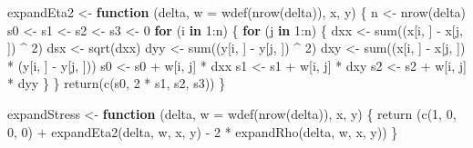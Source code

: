 \documentclass[
  12pt,
  letterpaper,
  DIV=11,
  numbers=noendperiod]{scrreprt}
\newenvironment{Shaded}{\begin{snugshade}}{\end{snugshade}}
\newcommand{\AttributeTok}[1]{\textcolor[rgb]{0.40,0.45,0.13}{#1}}
\newcommand{\ControlFlowTok}[1]{\textcolor[rgb]{0.00,0.23,0.31}{\textbf{#1}}}
\newcommand{\DecValTok}[1]{\textcolor[rgb]{0.68,0.00,0.00}{#1}}
\newcommand{\FunctionTok}[1]{\textcolor[rgb]{0.28,0.35,0.67}{#1}}
\newcommand{\NormalTok}[1]{\textcolor[rgb]{0.00,0.23,0.31}{#1}}
\newcommand{\OtherTok}[1]{\textcolor[rgb]{0.00,0.23,0.31}{#1}}
\newcommand{\SpecialCharTok}[1]{\textcolor[rgb]{0.37,0.37,0.37}{#1}}
\theoremstyle{remark}
\begin{document}
\begin{Shaded}
\begin{Highlighting}[]
\NormalTok{expandEta2 }\OtherTok{\textless{}{-}} \ControlFlowTok{function}\NormalTok{ (delta, }\AttributeTok{w =} \FunctionTok{wdef}\NormalTok{(}\FunctionTok{nrow}\NormalTok{(delta)), x, y) \{}
\NormalTok{  n }\OtherTok{\textless{}{-}} \FunctionTok{nrow}\NormalTok{(delta)}
\NormalTok{  s0 }\OtherTok{\textless{}{-}}\NormalTok{ s1 }\OtherTok{\textless{}{-}}\NormalTok{ s2 }\OtherTok{\textless{}{-}}\NormalTok{ s3 }\OtherTok{\textless{}{-}} \DecValTok{0}
  \ControlFlowTok{for}\NormalTok{ (i }\ControlFlowTok{in} \DecValTok{1}\SpecialCharTok{:}\NormalTok{n) \{}
    \ControlFlowTok{for}\NormalTok{ (j }\ControlFlowTok{in} \DecValTok{1}\SpecialCharTok{:}\NormalTok{n) \{}
\NormalTok{      dxx }\OtherTok{\textless{}{-}} \FunctionTok{sum}\NormalTok{((x[i, ] }\SpecialCharTok{{-}}\NormalTok{ x[j, ]) }\SpecialCharTok{\^{}} \DecValTok{2}\NormalTok{)}
\NormalTok{      dsx }\OtherTok{\textless{}{-}} \FunctionTok{sqrt}\NormalTok{(dxx)}
\NormalTok{      dyy }\OtherTok{\textless{}{-}} \FunctionTok{sum}\NormalTok{((y[i, ] }\SpecialCharTok{{-}}\NormalTok{ y[j, ]) }\SpecialCharTok{\^{}} \DecValTok{2}\NormalTok{)}
\NormalTok{      dxy }\OtherTok{\textless{}{-}} \FunctionTok{sum}\NormalTok{((x[i, ] }\SpecialCharTok{{-}}\NormalTok{ x[j, ]) }\SpecialCharTok{*}\NormalTok{ (y[i, ] }\SpecialCharTok{{-}}\NormalTok{ y[j, ]))}
\NormalTok{      s0 }\OtherTok{\textless{}{-}}\NormalTok{ s0 }\SpecialCharTok{+}\NormalTok{ w[i, j] }\SpecialCharTok{*}\NormalTok{ dxx}
\NormalTok{      s1 }\OtherTok{\textless{}{-}}\NormalTok{ s1 }\SpecialCharTok{+}\NormalTok{ w[i, j] }\SpecialCharTok{*}\NormalTok{ dxy}
\NormalTok{      s2 }\OtherTok{\textless{}{-}}\NormalTok{ s2 }\SpecialCharTok{+}\NormalTok{ w[i, j] }\SpecialCharTok{*}\NormalTok{ dyy}
\NormalTok{    \}}
\NormalTok{  \}}
  \FunctionTok{return}\NormalTok{(}\FunctionTok{c}\NormalTok{(s0, }\DecValTok{2} \SpecialCharTok{*}\NormalTok{ s1, s2, s3))}
\NormalTok{\}}

\NormalTok{expandStress }\OtherTok{\textless{}{-}} \ControlFlowTok{function}\NormalTok{ (delta, }\AttributeTok{w =} \FunctionTok{wdef}\NormalTok{(}\FunctionTok{nrow}\NormalTok{(delta)), x, y) \{}
  \FunctionTok{return}\NormalTok{ (}\FunctionTok{c}\NormalTok{(}\DecValTok{1}\NormalTok{, }\DecValTok{0}\NormalTok{, }\DecValTok{0}\NormalTok{, }\DecValTok{0}\NormalTok{) }\SpecialCharTok{+} \FunctionTok{expandEta2}\NormalTok{(delta, w, x, y) }\SpecialCharTok{{-}} \DecValTok{2} \SpecialCharTok{*} \FunctionTok{expandRho}\NormalTok{(delta, w, x, y))}
\NormalTok{\}}


\end{Highlighting}
\end{Shaded}
\end{document}
